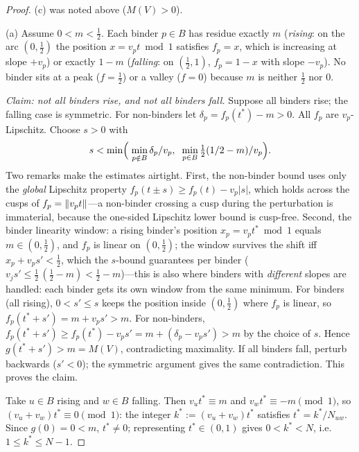 \begin{proof}
(c) was noted above ($M(V)>0$).

(a) Assume $0<m<\tfrac12$. Each binder $p\in B$ has residue exactly $m$
(\emph{rising}: on the arc $(0,\tfrac12)$ the position $x=v_p t\bmod 1$
satisfies $f_p=x$, which is increasing at slope $+v_p$) or exactly $1-m$
(\emph{falling}: on $(\tfrac12,1)$, $f_p=1-x$ with slope $-v_p$). No
binder sits at a peak ($f=\tfrac12$) or a valley ($f=0$) because $m$ is
neither $\tfrac12$ nor $0$.

\emph{Claim: not all binders rise, and not all binders fall.} Suppose all
binders rise; the falling case is symmetric. For non-binders let
$\delta_p=f_p(t^\ast)-m>0$. All $f_p$ are $v_p$-Lipschitz. Choose
$s>0$ with
\[
s<\min\Bigl(\;\min_{p\notin B}\delta_p/v_p,\;\;
                \min_{p\in B}\tfrac{1}{2}(1/2-m)/v_p\Bigr).
\]
Two remarks make the estimates airtight. First, the non-binder bound
uses only the \emph{global} Lipschitz property
$f_p(t\pm s)\ge f_p(t)-v_p|s|$, which holds across the cusps of
$f_p=\lVert v_pt \rVert$---a non-binder crossing a cusp during the
perturbation is immaterial, because the one-sided Lipschitz lower
bound is cusp-free. Second, the binder linearity window: a rising
binder's position $x_p=v_pt^\ast\bmod 1$ equals $m\in(0,\tfrac12)$,
and $f_p$ is linear on $(0,\tfrac12)$; the window survives the shift
iff $x_p+v_ps'<\tfrac12$, which the $s$-bound guarantees per binder
($v_js'\le\tfrac12\,(\tfrac12-m)<\tfrac12-m$)---this is also where
binders with \emph{different} slopes are handled: each binder gets its
own window from the same minimum.
For binders (all rising), $0<s'\le s$ keeps the position inside
$(0,\tfrac12)$ where $f_p$ is linear, so
$f_p(t^\ast+s')=m+v_p s'>m$. For non-binders,
$f_p(t^\ast+s')\ge f_p(t^\ast)-v_p s'=m+(\delta_p-v_p s')>m$ by the
choice of $s$. Hence $g(t^\ast+s')>m=M(V)$, contradicting maximality. If
all binders fall, perturb backwards ($s'<0$); the symmetric argument gives
the same contradiction. This proves the claim.

Take $u\in B$ rising and $w\in B$ falling. Then
$v_u t^\ast\equiv m$ and $v_w t^\ast\equiv -m \pmod 1$, so
$(v_u+v_w)t^\ast\equiv 0 \pmod 1$: the integer
$k^\ast:=(v_u+v_w)t^\ast$ satisfies $t^\ast=k^\ast/N_{uw}$. Since
$g(0)=0<m$, $t^\ast\ne 0$; representing $t^\ast\in(0,1)$ gives
$0<k^\ast<N$, i.e.\ $1\le k^\ast\le N-1$.

\end{proof}

